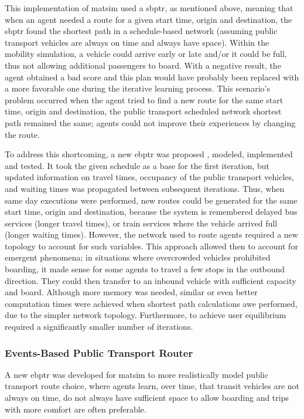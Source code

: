 This implementation of \gls{matsim} used a \gls{sbptr}, as mentioned above, meaning that when an agent needed a route for a given start time, origin and destination, the \gls{sbptr} found the shortest path in a schedule-based network (assuming public transport vehicles are always on time and always have space). Within the mobility simulation, a vehicle could arrive early or late and/or it could be full, thus not allowing additional passengers to board. With a negative result, the agent obtained a bad score and this plan would have probably been replaced with a more favorable one during the iterative learning process. This scenario's problem occurred when the agent tried to find a new route for the same start time, origin and destination, the public transport scheduled network shortest path remained the same; agents could not improve their experiences by changing the route.

To address this shortcoming, a new \gls{ebptr} was proposed \citep[][]{OrdonezErath_TechRep_FCL_2013}, modeled, implemented and tested. It took the given schedule as a base for the first iteration, but updated information on travel times, occupancy of the public transport vehicles, and waiting times was propagated between subsequent iterations. Thus, when same day executions were performed, new routes could be generated for the same start time, origin and destination, because the system is remembered delayed bus services (longer travel times), or train services where the vehicle arrived full (longer waiting times). However, the network used to route agents required a new topology to account for such variables. This approach allowed then to account for emergent phenomena; in situations where overcrowded vehicles prohibited boarding, it made sense for some agents to travel a few stops in the outbound direction. They could then transfer to an inbound vehicle with sufficient capacity and board. Although more memory was needed, similar or even better computation times were achieved when shortest path calculations awe performed, due to the simpler network topology. Furthermore, to achieve user equilibrium required a significantly smaller number of iterations.

\subsubsection{Events-Based Public Transport Router} 
\label{sec:RouterStructure}
A new \gls{ebptr} was developed for \gls{matsim} to more realistically model public transport route choice, where agents learn, over time, that transit vehicles are not always on time, do not always have sufficient space to allow boarding and trips with more comfort are often preferable.


